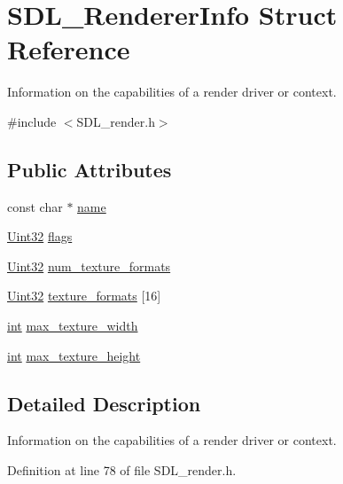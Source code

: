 \hypertarget{struct_s_d_l___renderer_info}{\section{S\-D\-L\-\_\-\-Renderer\-Info Struct Reference}
\label{struct_s_d_l___renderer_info}
}


Information on the capabilities of a render driver or context.  




{\ttfamily \#include $<$S\-D\-L\-\_\-render.\-h$>$}

\subsection*{Public Attributes}
\begin{DoxyCompactItemize}
\item 
const char $\ast$ \hyperlink{struct_s_d_l___renderer_info_a433ecb2865c81ba9f28038e56a4ae6f3}{name}
\item 
\hyperlink{_s_d_l__stdinc_8h_add440eff171ea5f55cb00c4a9ab8672d}{Uint32} \hyperlink{struct_s_d_l___renderer_info_a95cf0ffd1704fd0a4dd8ceac6c9f0542}{flags}
\item 
\hyperlink{_s_d_l__stdinc_8h_add440eff171ea5f55cb00c4a9ab8672d}{Uint32} \hyperlink{struct_s_d_l___renderer_info_acdec165b2053b914313f5996983ec6b8}{num\-\_\-texture\-\_\-formats}
\item 
\hyperlink{_s_d_l__stdinc_8h_add440eff171ea5f55cb00c4a9ab8672d}{Uint32} \hyperlink{struct_s_d_l___renderer_info_a88450f9d48e593ec4571e3ba7cc3427d}{texture\-\_\-formats} \mbox{[}16\mbox{]}
\item 
\hyperlink{_s_d_l__thread_8h_a6a64f9be4433e4de6e2f2f548cf3c08e}{int} \hyperlink{struct_s_d_l___renderer_info_a6e6757e3d5c1f0922adaba39380edfa6}{max\-\_\-texture\-\_\-width}
\item 
\hyperlink{_s_d_l__thread_8h_a6a64f9be4433e4de6e2f2f548cf3c08e}{int} \hyperlink{struct_s_d_l___renderer_info_a87c6a13e8d535c2148f8913c05e13102}{max\-\_\-texture\-\_\-height}
\end{DoxyCompactItemize}


\subsection{Detailed Description}
Information on the capabilities of a render driver or context. 

Definition at line 78 of file S\-D\-L\-\_\-render.\-h.



